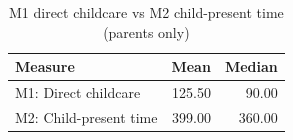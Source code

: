\begin{table}[ht]
\centering
\begin{tabular}{lrr}
  \toprule
Measure & Mean & Median \\ 
  \midrule
M1: Direct childcare & 125.50 & 90.00 \\ 
  M2: Child-present time & 399.00 & 360.00 \\ 
   \bottomrule
\end{tabular}
\caption{M1 direct childcare vs M2 child-present time (parents only)} 
\label{tab:desc_m1_m2}
\end{table}
